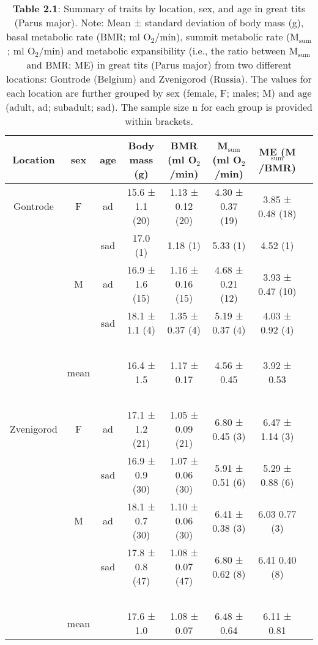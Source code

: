 \documentclass[10pt, twoside]{book} %
\begin{document}
\clearpage
\begin{sidewaystable}[!ht]
    \centering
\small
\caption*{\textbf{Table 2.1}: Summary of traits by location, sex, and age in great tits (Parus major). Note: Mean ± standard deviation of body mass (g), basal metabolic rate (BMR; ml O$_{\text{2}}$/min), summit metabolic rate (M$_{\text{sum}}$; ml O$_{\text{2}}$/min) and metabolic expansibility (i.e., the ratio between M$_{\text{sum}}$ and BMR; ME) in great tits (Parus major) from two different locations: Gontrode (Belgium) and Zvenigorod (Russia). The values for each location are further grouped by sex (female, F; males; M) and age (adult, ad; subadult; sad). The sample size n for each group is provided within brackets.}
\begin{adjustbox}{max width=\textwidth}    
    \begin{tabular}{cccccccc}
    \hline
        Location & sex & age & Body mass (g) & BMR (ml O$_{\text{2}}$/min) & M$_{\text{sum}}$ (ml O$_{\text{2}}$/min) & ME (M$_{\text{sum}}$/BMR) \\ \hline
        Gontrode & F & ad & 15.6 ± 1.1 (20) & 1.13 ± 0.12 (20) & 4.30 ± 0.37 (19) & 3.85 ± 0.48 (18) \\ 
        ~ & ~ & sad & 17.0 (1) & 1.18 (1) & 5.33 (1) & 4.52 (1) \\ 
        ~ & M & ad & 16.9 ± 1.6 (15) & 1.16 ± 0.16 (15) & 4.68 ± 0.21 (12)  & 3.93 ± 0.47 (10) \\ 
        ~ & ~ & sad & 18.1 ± 1.1 (4) & 1.35 ± 0.37 (4) & 5.19 ± 0.37 (4)  & 4.03 ± 0.92 (4) \\ 
        ~ & ~ & ~ & ~ & ~ & ~  & ~ \\ 
        ~ & mean & ~ & 16.4 ± 1.5 & 1.17 ± 0.17 & 4.56 ± 0.45 & 3.92 ± 0.53 \\ 
        ~ & ~ & ~ & ~ & ~ & ~ &  ~ \\ 
        Zvenigorod & F & ad & 17.1 ± 1.2 (21) & 1.05 ± 0.09 (21) & 6.80 ± 0.45 (3) & 6.47 ± 1.14 (3) \\ 
        ~ & ~ & sad & 16.9 ± 0.9 (30) & 1.07 ± 0.06 (30) & 5.91 ± 0.51 (6)  & 5.29 ± 0.88 (6) \\ 
        ~ & M & ad & 18.1 ± 0.7 (30) & 1.10 ± 0.06 (30) & 6.41 ± 0.38 (3)  & 6.03 0.77 (3) \\ 
        ~ & ~ & sad & 17.8 ± 0.8 (47) & 1.08 ± 0.07 (47) & 6.80 ± 0.62 (8)  & 6.41 0.40 (8) \\ 
        ~ & ~ & ~ & ~ & ~ & ~ &  ~ \\ 
        ~ & mean & ~ & 17.6 ± 1.0 & 1.08 ± 0.07 & 6.48 ± 0.64  & 6.11 ± 0.81 \\ \hline
    \end{tabular}
\end{adjustbox}
\end{sidewaystable}
\clearpage
\end{document}
